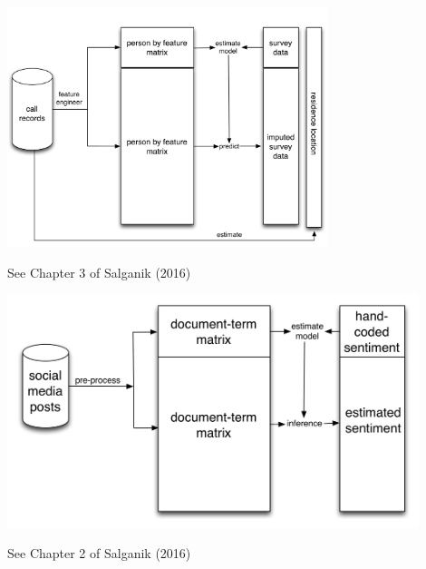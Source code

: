 \documentclass[aspectratio=169]{beamer}
\def\vf{\vfill}
\begin{document}
\begin{frame}

\begin{center}
\includegraphics[width=0.7\textwidth]{figures/blumenstock_predicting_2015_schematic_6}
\end{center}
\vf
See Chapter 3 of Salganik (2016)
\end{frame}
\begin{frame}

\begin{center}
\includegraphics[width=0.9\textwidth]{figures/king_how_2013_schematic}
\end{center}
\vf
See Chapter 2 of Salganik (2016)
\end{frame}
\end{document}
